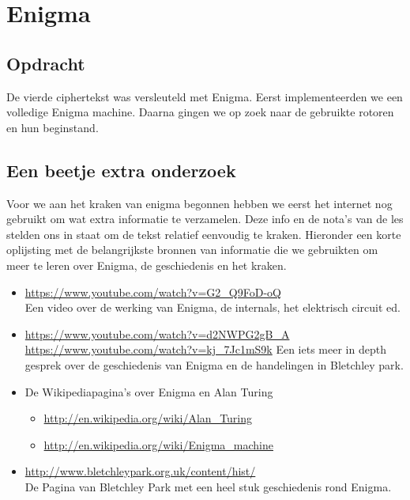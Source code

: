 
\section{Enigma}
\subsection{Opdracht}
De vierde ciphertekst was versleuteld met Enigma. Eerst implementeerden we een volledige Enigma machine. Daarna gingen we op zoek naar de gebruikte rotoren en hun beginstand.

\subsection{Een beetje extra onderzoek}
Voor we aan het kraken van enigma begonnen hebben we eerst het internet nog gebruikt om wat extra informatie te verzamelen. Deze info en de nota's van de les stelden ons in staat om de tekst relatief eenvoudig te kraken.
Hieronder een korte oplijsting met de belangrijkste bronnen van informatie die we gebruikten om meer te leren over Enigma, de geschiedenis en het kraken.

\begin{itemize}
\item \url{https://www.youtube.com/watch?v=G2_Q9FoD-oQ} \\
	Een video over de werking van Enigma, de internals, het elektrisch circuit ed.
\item \url{https://www.youtube.com/watch?v=d2NWPG2gB_A}
\url{https://www.youtube.com/watch?v=kj_7Jc1mS9k}
Een iets meer in depth gesprek over de geschiedenis van Enigma en de handelingen in Bletchley park.
\item De Wikipediapagina's over Enigma en Alan Turing
	\begin{itemize}
		\item \url{http://en.wikipedia.org/wiki/Alan_Turing}
		\item \url{http://en.wikipedia.org/wiki/Enigma_machine}
	\end{itemize}
	\item \url{http://www.bletchleypark.org.uk/content/hist/} \\ De Pagina van Bletchley Park met een heel stuk geschiedenis rond Enigma.
\end{itemize}


